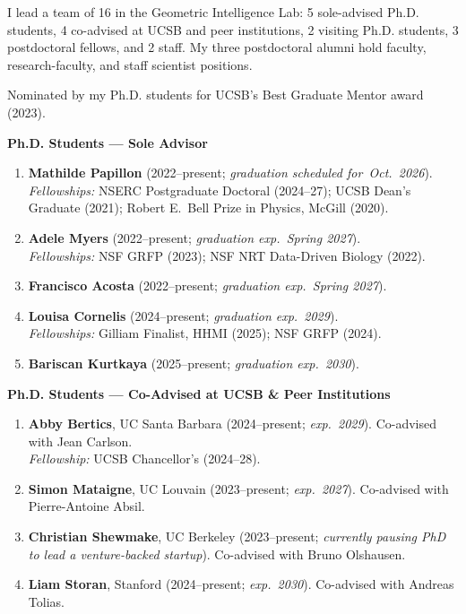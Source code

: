 
I lead a team of 16 in the Geometric Intelligence Lab: 5 sole-advised Ph.D. students, 4 co-advised at UCSB and peer institutions, 2 visiting Ph.D. students, 3 postdoctoral fellows, and 2 staff. My three postdoctoral alumni hold faculty, research-faculty, and staff scientist positions.

Nominated by my Ph.D. students for UCSB's Best Graduate Mentor award (2023).

\smallskip
\noindent\textbf{Ph.D. Students --- Sole Advisor}
\begin{enumerate}[leftmargin=*,itemsep=0.35em,topsep=0.2em,parsep=0pt,partopsep=0pt]
\raggedright
  \item \textbf{Mathilde Papillon} (2022--present; \emph{graduation scheduled for\ Oct.\ 2026}). \\
        \textit{Fellowships:} NSERC Postgraduate Doctoral (2024--27); UCSB Dean's Graduate (2021); Robert E.\ Bell Prize in Physics, McGill (2020).
  \item \textbf{Adele Myers} (2022--present; \emph{graduation exp.\ Spring 2027}). \\
        \textit{Fellowships:} NSF GRFP (2023); NSF NRT Data-Driven Biology (2022).
  \item \textbf{Francisco Acosta} (2022--present; \emph{graduation exp.\ Spring 2027}).
  \item \textbf{Louisa Cornelis} (2024--present; \emph{graduation exp.\ 2029}). \\
        \textit{Fellowships:} Gilliam Finalist, HHMI (2025); NSF GRFP (2024).
  \item \textbf{Bariscan Kurtkaya} (2025--present; \emph{graduation exp.\ 2030}).
\end{enumerate}

\smallskip
\noindent\textbf{Ph.D. Students --- Co-Advised at UCSB \& Peer Institutions}
\begin{enumerate}[leftmargin=*,itemsep=0.25em,topsep=0.2em,parsep=0pt,partopsep=0pt]
\raggedright
  \item \textbf{Abby Bertics}, UC Santa Barbara (2024--present; \emph{exp.\ 2029}). Co-advised with Jean Carlson.\\
        \textit{Fellowship:} UCSB Chancellor's (2024--28).
  \item \textbf{Simon Mataigne}, UC Louvain (2023--present; \emph{exp.\ 2027}). Co-advised with Pierre-Antoine Absil.
  \item \textbf{Christian Shewmake}, UC Berkeley (2023--present; \emph{currently pausing PhD to lead a venture-backed startup}). Co-advised with Bruno Olshausen.
  \item \textbf{Liam Storan}, Stanford (2024--present; \emph{exp.\ 2030}). Co-advised with Andreas Tolias.
\end{enumerate}

